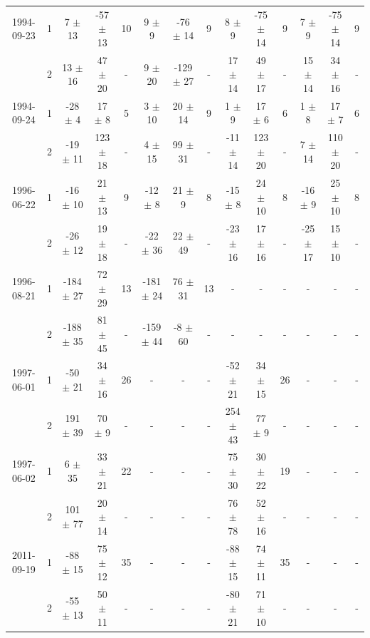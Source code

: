 \documentclass[12pt,a4paper]{report}
\begin{document}
\begin{landscape}
\begin{longtable}{|c|c|c|c|c|c|c|c|c|c|c|c|c|c|}
1994-09-23 & 1 & 7 $\pm$ 13 & -57 $\pm$ 13 & 10 & 9 $\pm$ 9 & -76 $\pm$ 14 & 9 & 8 $\pm$ 9 & -75 $\pm$ 14 & 9 & 7 $\pm$ 9 & -75 $\pm$ 14 & 9\\
 & 2 & 13 $\pm$ 16 & 47 $\pm$ 20 & - & 9 $\pm$ 20 & -129 $\pm$ 27 & - & 17 $\pm$ 14 & 49 $\pm$ 17 & - & 15 $\pm$ 14 & 34 $\pm$ 16 & -\\
\hline

1994-09-24 & 1 & -28 $\pm$ 4 & 17 $\pm$ 8 & 5 & 3 $\pm$ 10 & 20 $\pm$ 14 & 9 & 1 $\pm$ 9 & 17 $\pm$ 6 & 6 & 1 $\pm$ 8 & 17 $\pm$ 7 & 6\\
 & 2 & -19 $\pm$ 11 &  123 $\pm$ 18 & - & 4 $\pm$ 15 &  99 $\pm$ 31 & - & -11 $\pm$ 14 &  123 $\pm$ 20 & - & 7 $\pm$ 14 & 110 $\pm$ 20 & -\\
\hline

1996-06-22 & 1 & -16 $\pm$ 10 & 21 $\pm$ 13 & 9 & -12 $\pm$ 8 & 21 $\pm$ 9 & 8 & -15 $\pm$ 8 & 24 $\pm$ 10 & 8 & -16 $\pm$ 9 & 25 $\pm$ 10 & 8\\
 & 2 & -26 $\pm$ 12 & 19 $\pm$ 18 & - & -22 $\pm$ 36 & 22 $\pm$ 49 & - & -23 $\pm$ 16 & 17 $\pm$ 16 & - & -25 $\pm$ 17 & 15 $\pm$ 10 & -\\
\hline

1996-08-21 & 1 & -184 $\pm$ 27 & 72 $\pm$ 29 & 13 & -181 $\pm$ 24 & 76 $\pm$ 31 & 13 & - & - & - & - & - & - \\
 & 2 & -188 $\pm$ 35 &  81 $\pm$ 45 & - & -159 $\pm$ 44 & -8 $\pm$ 60 & - & - & - & - & - & - & -\\
\hline

1997-06-01 & 1 & -50 $\pm$ 21 & 34 $\pm$ 16 & 26 & - & - & - & -52 $\pm$ 21 & 34 $\pm$ 15 & 26 & - & - & -\\
 & 2 & 191 $\pm$ 39 &  70 $\pm$ 9 & - & - & - & - & 254 $\pm$ 43 &  77 $\pm$ 9 & - & - & - & -\\
\hline

1997-06-02 & 1 & 6 $\pm$ 35 & 33 $\pm$ 21 & 22 & - & - & - & 75 $\pm$ 30 & 30 $\pm$ 22 & 19 & - & - & -\\
 & 2 & 101 $\pm$ 77 &  20 $\pm$ 14 & - & - & - & - & 76 $\pm$ 78 & 52 $\pm$ 16 & - & - & - & -\\
\hline

2011-09-19 & 1 & -88 $\pm$ 15 & 75 $\pm$ 12 & 35 & - & - & - & -88 $\pm$ 15 & 74 $\pm$ 11 & 35 & - & - & -\\
 & 2 & -55 $\pm$ 13 & 50 $\pm$ 11 & - & - & - & - & -80 $\pm$ 21 & 71 $\pm$ 10 & - & - & - & -\\
\hline

\hline
\end{longtable}

\end{landscape}
\end{document}
